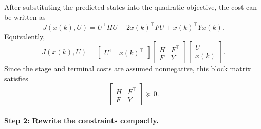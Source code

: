 After substituting the predicted states into the quadratic objective, the cost can be written as
\[
J(x(k),U)=U^\top H U + 2x(k)^\top F U + x(k)^\top Y x(k).
\]
Equivalently,
\[
J(x(k),U)=
\begin{bmatrix}
U^\top & x(k)^\top
\end{bmatrix}
\begin{bmatrix}
H & F^\top\\
F & Y
\end{bmatrix}
\begin{bmatrix}
U\\
x(k)
\end{bmatrix}.
\]
Since the stage and terminal costs are assumed nonnegative, this block matrix satisfies
\[
\begin{bmatrix}
H & F^\top\\
F & Y
\end{bmatrix}\succeq 0.
\]

\paragraph{Step 2: Rewrite the constraints compactly.}

